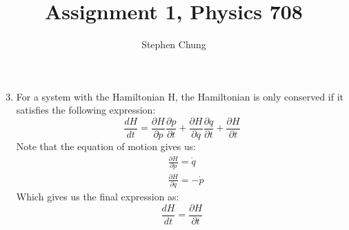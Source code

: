 \documentclass[12pt,a4paper]{article}
\begin{document}
	\title{Assignment 1, Physics 708}
	\author{Stephen Chung}
	\date{}
	\maketitle
	
\begin{enumerate}
	\setcounter{enumi}{2}
	\item For a system with the Hamiltonian H, the Hamiltonian is only conserved if it satisfies the following expression:
	\[\frac{dH}{dt} = \frac{\partial H}{\partial p} \frac{\partial p}{\partial t} + \frac{\partial H}{\partial q}\frac{\partial q}{\partial t} + \frac{\partial H}{\partial t}\]
    Note that the equation of motion gives us:
    \begin{align*}
    &\frac{\partial H}{\partial p} = \dot{q} \\
    &\frac{\partial H}{\partial q} = -\dot{p}
    \end{align*}
    Which gives us the final expression as:
    \[\frac{dH}{dt} = \frac{\partial H}{\partial t}\]
    

\end{enumerate}
\end{document}
